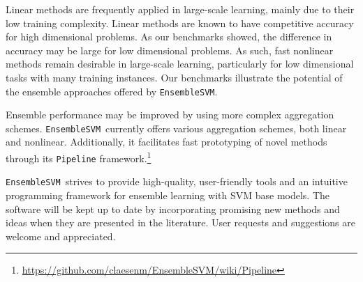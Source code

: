 \documentclass[twoside,11pt]{article}
\newcommand{\esvm}{\texttt{\selectfont EnsembleSVM}}
\begin{document}
Linear methods are frequently applied in large-scale learning, mainly due to their low training complexity. Linear methods are known to have competitive accuracy for high dimensional problems. As our benchmarks showed, the difference in accuracy may be large for low dimensional problems. As such, fast nonlinear methods remain desirable in large-scale learning, particularly for low dimensional tasks with many training instances. Our benchmarks illustrate the potential of the ensemble approaches offered by \esvm.

Ensemble performance may be improved by using more complex aggregation schemes. \esvm\ currently offers various aggregation schemes, both linear and nonlinear. Additionally, it facilitates fast prototyping of novel methods through its \texttt{Pipeline} framework.\footnote{\url{https://github.com/claesenm/EnsembleSVM/wiki/Pipeline}}

\esvm\ strives to provide high-quality,
user-friendly tools and an intuitive programming framework for ensemble learning with SVM base models. The software will be kept up to date by incorporating promising new methods and ideas when they are presented in the literature. User requests and suggestions are welcome and appreciated.


\normalsize

\newpage

\end{document}
